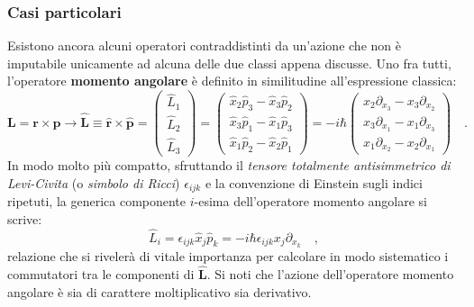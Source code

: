 \subsubsection{Casi particolari}
Esistono ancora alcuni operatori contraddistinti da un'azione che non è imputabile unicamente ad alcuna delle due classi appena discusse. Uno fra tutti, l'operatore \textbf{momento angolare} è definito in similitudine all'espressione classica:
\begin{equation}
    \bm{L} = \bm{r} \times \bm{p} \to \hat{\bm{L}} \equiv \hat{\bm{r}} \times \hat{\bm{p}} =
    \begin{pmatrix}
        \hat{L}_1 \\
        \hat{L}_2 \\
        \hat{L}_3
    \end{pmatrix} 
    = 
    \begin{pmatrix}
        \hat{x}_2\hat{p}_3 - \hat{x}_3\hat{p}_2 \\
        \hat{x}_3\hat{p}_1 - \hat{x}_1\hat{p}_3 \\
        \hat{x}_1\hat{p}_2 - \hat{x}_2\hat{p}_1
    \end{pmatrix}
    = -i\hbar
    \begin{pmatrix}
        x_2 \partial_{x_3} - x_3 \partial_{x_2} \\
        x_3 \partial_{x_1} - x_1 \partial_{x_3} \\
        x_1 \partial_{x_2} - x_2 \partial_{x_1}
    \end{pmatrix} \quad.
\end{equation}
In modo molto più compatto, sfruttando il \emph{tensore totalmente antisimmetrico di Levi-Civita} (o \emph{simbolo di Ricci}) $\epsilon_{ijk}$ e la convenzione di Einstein sugli indici ripetuti, la generica componente $i$-esima dell'operatore momento angolare si scrive:
\[
    \hat{L}_i = \epsilon_{ijk} \hat{x}_j \hat{p}_k = -i\hbar \epsilon_{ijk} x_j \partial_{x_k} \quad,
\]
relazione che si rivelerà di vitale importanza per calcolare in modo sistematico i commutatori tra le componenti di $\hat{\bm{L}}$. Si noti che l'azione dell'operatore momento angolare è sia di carattere moltiplicativo sia derivativo.

